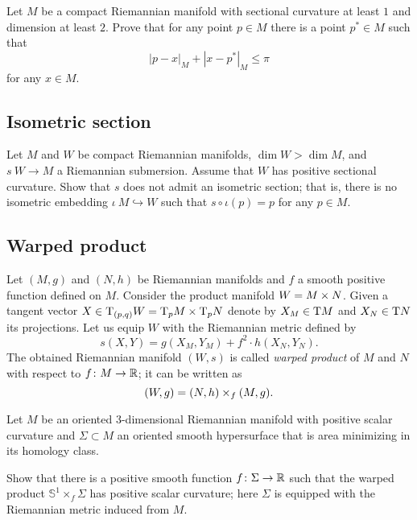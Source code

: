 \begin{pr}
Let $M$ be a compact Riemannian manifold with sectional curvature at least $1$ 
and dimension at least $2$. 
Prove that for any point $p\in M$ there is a point $p^*\in M$ such that 
\[|p-x|_M+|x-p^*|_M\le \pi\]
for any $x\in M$.
\end{pr}

\subsection*{Isometric section\hard}
\label{Isometric section}

\begin{pr}
Let $M$ and $W$ be compact Riemannian manifolds,
$\dim W>\dim M$,
and $s\:W\to M$ a Riemannian submersion.
Assume that $W$ has positive sectional curvature.
Show that $s$ does not admit an isometric section;
that is, there is no isometric embedding $\iota\:M\hookrightarrow W$ such that $s\circ\iota(p)=p$ for any $p\in M$.
\end{pr}

\subsection*{Warped product}
\label{Warped product}
\label{page:warped product}

Let $(M,g)$ and $(N,h)$ be Riemannian manifolds 
and $f$ a smooth positive function defined on $M$.
Consider the product manifold $W\z=M\times N$.
Given a tangent vector 
$X\z\in \T_{(p,q)} W
\z=\T_p M\times \T_p N$ denote by 
$X_M\z\in \T M$ and $X_N\z\in \T N$ its projections.
Let us equip $W$ with the Riemannian metric defined by
\[s(X,Y)=g(X_M,Y_M)+f^2\cdot h(X_N,Y_N).\]
The obtained Riemannian manifold $(W,s)$ is called \emph{warped product} of $M$ and $N$ with respect to $f\colon M\to \mathbb{R}$;
it can be written as  
\[(W,g)\z=(N,h)\times_f(M,g).\]

\begin{pr}
Let $M$ be an oriented 3-dimensional Riemannian manifold with positive scalar curvature 
and $\Sigma\subset M$ an oriented smooth hypersurface that is area minimizing in its homology class.

Show that there is a positive smooth function $f\colon\Sigma\to \mathbb{R}$
such that the warped product $\mathbb S^1\times_f \Sigma$
has positive scalar curvature;
here $\Sigma$ is equipped with the Riemannian metric
induced from $M$.
\end{pr}

